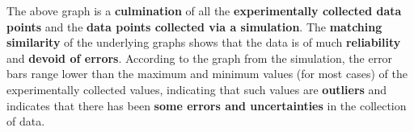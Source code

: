 {The above graph is a \textbf{culmination} of all the \textbf{experimentally collected data points} and the \textbf{data points collected via a simulation}. The \textbf{matching similarity} of the underlying graphs shows that the data is of much \textbf{reliability} and \textbf{devoid of errors}. According to the graph from the simulation, the error bars range lower than the maximum and minimum values (for most cases) of the experimentally collected values, indicating that such values are \textbf{outliers} and indicates that there has been \textbf{some errors and uncertainties} in the collection of data.}
